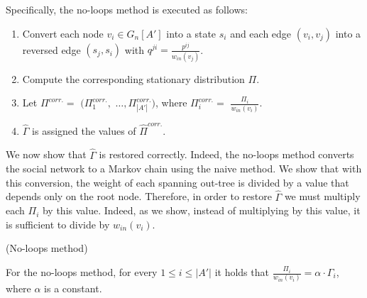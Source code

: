 \documentclass[sigconf,anonymous]{aamas}
\begin{document}
Specifically, the no-loops method is executed as follows:
\begin{enumerate}
    \item Convert each node $v_i \in G_n[A']$ into a state $s_i$ and each edge $(v_i,v_j)$ into a reversed edge $(s_j,s_i)$ with $q^{ji} = \frac{p^{ij}}{w_{in}(v_j)}$. %
    \item Compute the corresponding stationary distribution $\Pi$.
    \item Let $\Pi^{corr.} =$ $ (\Pi^{corr.}_1,$ $ \ldots, \Pi^{corr.}_{|A'|})$, where $\Pi^{corr.}_i =$ $\frac{\Pi_i}{w_{in}(v_i)}$.
    \item $\hat{\Gamma}$ is assigned the values of $\hat{\Pi}^{corr.}$.
    
\end{enumerate}

We now show that $\hat{\Gamma}$ is restored correctly.  Indeed, the no-loops method converts the social network to a Markov chain using the naive method. We show that with this conversion, the weight of each spanning out-tree is divided by a value that depends only on the root node.
Therefore, in order to restore $\hat{\Gamma}$ we must multiply each $\Pi_i$ by this value. Indeed, as we show, instead of multiplying by this value, it is sufficient to divide by $w_{in}(v_i)$.



\begin{theorem}\label{NoLoop}
(No-loops method)

For the no-loops method, for every $1\leq i \leq |A'|$ it holds that $\frac{\Pi_i}{w_{in}(v_i)} =\alpha \cdot \Gamma_i$,
where $\alpha$ is a constant.


\end{theorem}
\end{document}
